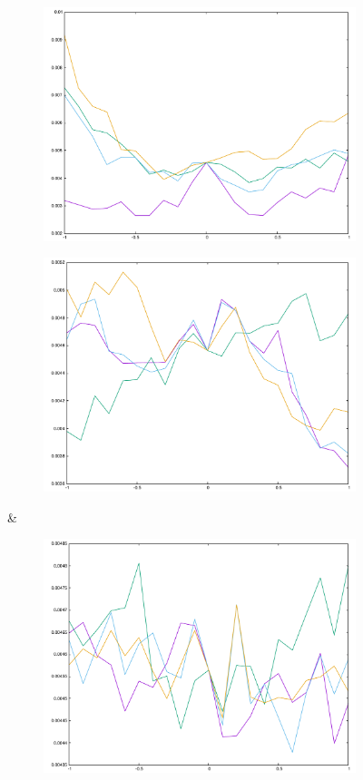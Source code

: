 \begin{figure}[H]
\begin{subfigure}{.33\textwidth}
	\includegraphics[width=\linewidth]{fig/ajherr/t3tr/L_chi.pdf}
\end{subfigure}%
\begin{subfigure}{.33\textwidth}
	\includegraphics[width=\linewidth]{fig/ajherr/t3tr/M_chi.pdf}
\end{subfigure}&
\begin{subfigure}{.33\textwidth}
	\includegraphics[width=\linewidth]{fig/ajherr/t3tr/S_chi.pdf}

\end{subfigure}
\end{figure}
